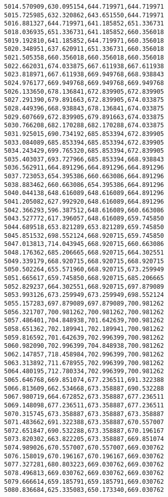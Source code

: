\documentclass[11pt]{article}
\begin{document}
\begin{Verbatim}[commandchars=\\\{\}]
5014.570909,630.095154,644.719971,644.719971
5015.725985,632.320862,643.651550,644.719971
5016.881327,644.719971,641.185852,651.336731
5018.036935,651.336731,641.185852,660.356018
5019.192810,641.185852,644.719971,660.356018
5020.348951,637.620911,651.336731,660.356018
5021.505358,660.356018,660.356018,660.356018
5022.662031,674.033875,667.611938,667.611938
5023.818971,667.611938,669.949768,668.938843
5024.976177,669.949768,669.949768,669.949768
5026.133650,678.136841,672.839905,672.839905
5027.291390,679.891663,672.839905,674.033875
5028.449396,668.938843,678.136841,674.033875
5029.607669,672.839905,679.891663,674.033875
5030.766208,682.170288,682.170288,674.033875
5031.925015,690.734192,685.853394,672.839905
5033.084089,685.853394,685.853394,672.839905
5034.243429,699.765320,685.853394,672.839905
5035.403037,693.727966,685.853394,668.938843
5036.562911,664.891296,664.891296,664.891296
5037.723053,654.395386,660.663086,664.891296
5038.883462,660.663086,654.395386,664.891296
5040.044138,648.616089,648.616089,664.891296
5041.205082,627.992920,648.616089,664.891296
5042.366293,596.387512,648.616089,660.663086
5043.527772,617.396057,648.616089,659.745850
5044.689518,653.821289,653.821289,659.745850
5045.851532,698.552124,668.920715,659.745850
5047.013813,714.043945,668.920715,660.663086
5048.176362,685.206665,668.920715,664.302551
5049.339179,668.920715,668.920715,668.920715
5050.502264,655.571960,668.920715,673.259949
5051.665617,659.745850,668.920715,685.206665
5052.829237,664.302551,668.920715,697.879089
5053.993126,673.259949,673.259949,698.552124
5055.157283,697.879089,697.879089,700.981262
5056.321707,700.981262,700.981262,700.981262
5057.486401,704.848938,701.642639,700.981262
5058.651362,702.189941,702.189941,700.981262
5059.816592,701.642639,702.996399,700.981262
5060.982090,702.996399,704.848938,700.981262
5062.147857,718.458984,702.996399,700.981262
5063.313892,711.678955,702.996399,700.981262
5064.480195,712.780334,702.996399,700.981262
5065.646768,669.851074,677.236511,691.322388
5066.813609,662.534668,673.358887,690.532288
5067.980719,664.672852,673.358887,677.236511
5069.148098,677.236511,673.358887,677.236511
5070.315745,673.358887,673.358887,673.358887
5071.483662,691.322388,673.358887,670.557007
5072.651847,690.532288,673.358887,670.196167
5073.820302,663.822205,673.358887,669.851074
5074.989026,670.557007,670.557007,669.030762
5076.158019,670.196167,670.196167,669.030762
5077.327281,680.803223,669.030762,669.030762
5078.496813,669.030762,669.030762,669.030762
5079.666614,659.185791,659.185791,669.030762
5080.836684,625.335083,650.173340,669.030762

\end{Verbatim}
\end{document}
